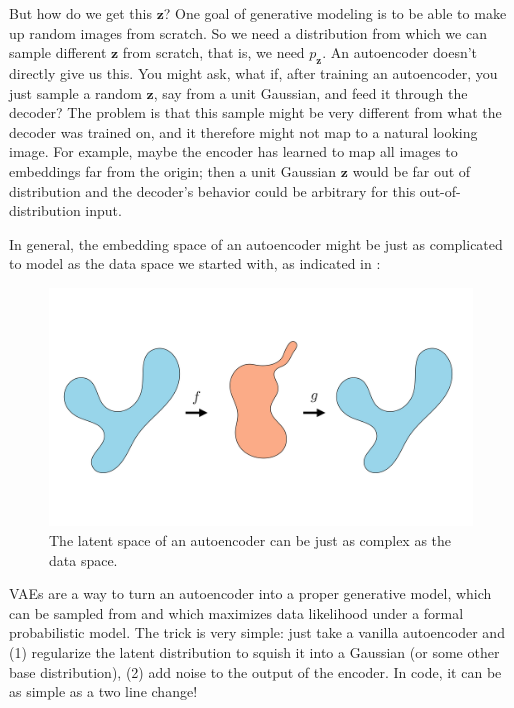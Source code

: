 But how do we get this $\mathbf{z}$? One goal of generative modeling is to be able to make up random images from scratch. So we need a distribution from which we can sample different $\mathbf{z}$ from scratch, that is, we need $p_{\mathbf{z}}$. An autoencoder doesn't directly give us this. You might ask, what if, after training an autoencoder, you just sample a random $\mathbf{z}$, say from a unit Gaussian, and feed it through the decoder? The problem is that this sample might be very different from what the decoder was trained on, and it therefore might not map to a natural looking image. For example, maybe the encoder has learned to map all images to embeddings far from the origin; then a unit Gaussian $\mathbf{z}$ would be far out of distribution and the decoder's behavior could be arbitrary for this out-of-distribution input. %

In general, the embedding space of an autoencoder might be just as complicated to model as the data space we started with, as indicated in \fig{\ref{fig:generative_modeling_and_representation_learning:autoencoder_complicated_latent_space}}:%
\begin{figure}[h!]
    \centerline{
    \includegraphics[width=0.6\linewidth]{./figures/generative_modeling_and_representation_learning/autoencoder_complicated_latent_space.pdf}
    }
    \caption{The latent space of an autoencoder can be just as complex as the data space.}
    \label{fig:generative_modeling_and_representation_learning:autoencoder_complicated_latent_space}
\end{figure}


VAEs are a way to turn an autoencoder into a proper generative model, which can be sampled from and which maximizes data likelihood under a formal probabilistic model. The trick is very simple: just take a vanilla autoencoder and (1) regularize the latent distribution to squish it into a Gaussian (or some other base distribution), (2) add noise to the output of the encoder. In code, it can be as simple as a two line change!

